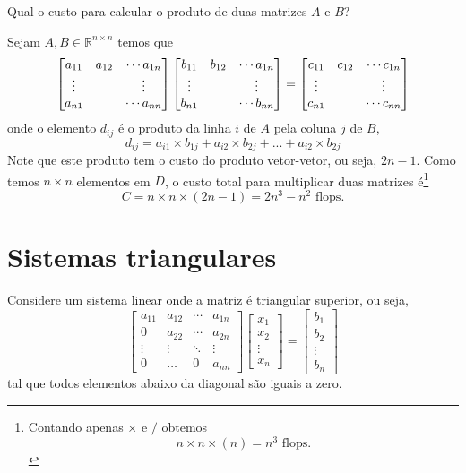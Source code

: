 \begin{ex}
Qual o custo para calcular o produto de duas matrizes  $A$ e $B$?
\end{ex}
\begin{sol}
Sejam $A, B \in \mathbb{R}^{n\times n}$ temos que
\begin{equation}
  \begin{bmatrix} a_{11}&a_{12}&\cdots a_{1n} \\ \vdots&&\vdots \\ a_{n1}&&\cdots a_{nn} \end{bmatrix}
  \begin{bmatrix} b_{11}&b_{12}&\cdots a_{1n} \\ \vdots&&\vdots \\ b_{n1}&&\cdots b_{nn} \end{bmatrix}
 =\begin{bmatrix} c_{11}&c_{12}&\cdots c_{1n} \\ \vdots&&\vdots \\ c_{n1}&&\cdots c_{nn} \end{bmatrix}
\end{equation}
onde o elemento $d_{ij}$ é o produto da linha $i$ de $A$ pela coluna $j$ de $B$,
\begin{equation}
  d_{ij}=  a_{i1}\times b_{1j} + a_{i2}\times b_{2j} +...+a_{i2}\times b_{2j}
\end{equation}
Note que este produto tem o custo do produto vetor-vetor, ou seja, $2n-1$. Como temos $n\times n$ elementos em $D$, o custo total para multiplicar duas matrizes é\footnote{Contando apenas $\times$ e $/$ obtemos
\begin{equation}
  n\times n \times(n)  = n^3 \text{~flops.}
\end{equation}
}
\begin{equation}
  C= n\times n \times (2n-1)= 2n^3-n^2 \text{~flops.}
\end{equation}

\end{sol}


\section{Sistemas triangulares}
Considere um sistema linear onde a matriz é triangular superior, ou seja,
\begin{equation}\begin{bmatrix}
a_{11} & a_{12} & \cdots & a_{1n}\\
0      & a_{22} & \cdots & a_{2n}\\
\vdots & \vdots & \ddots & \vdots\\
0      & \dots  & 0     & a_{nn}
\end{bmatrix}
\begin{bmatrix}
x_{1} \\
x_{2} \\
\vdots \\
x_{n}
\end{bmatrix}
 =\begin{bmatrix}
b_{1} \\
b_{2} \\
\vdots \\
b_{n}
\end{bmatrix}
\end{equation}
tal que todos elementos abaixo da diagonal são iguais a zero.

